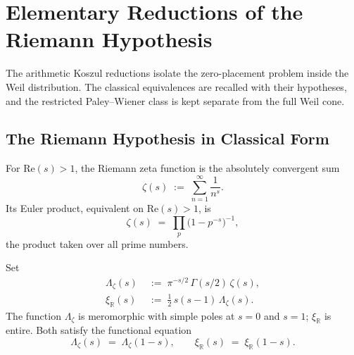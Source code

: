 \chapter{Elementary Reductions of the Riemann Hypothesis}
\label{v4-arith:w5-direct:closure-path}

The arithmetic Koszul reductions isolate the zero-placement problem
inside the Weil distribution.  The classical equivalences are recalled
with their hypotheses, and the restricted Paley--Wiener class is kept
separate from the full Weil cone.

\section{The Riemann Hypothesis in Classical Form}
\label{v4-arith:w5-direct:RH-classical}

\begin{definition}
\label{v4-arith:w5-direct:def:zeta}
For \(\mathrm{Re}(s)>1\), the Riemann zeta function is the absolutely
convergent sum
\begin{equation}
\label{v4-arith:w5-direct:eq:zeta-dirichlet}
\zeta(s)\;:=\;\sum_{n=1}^{\infty}\frac{1}{n^{s}}.
\end{equation}
Its Euler product, equivalent on \(\mathrm{Re}(s)>1\), is
\begin{equation}
\label{v4-arith:w5-direct:eq:zeta-euler}
\zeta(s)\;=\;\prod_{p}\bigl(1-p^{-s}\bigr)^{-1},
\end{equation}
the product taken over all prime numbers.
\end{definition}

\begin{definition}
\label{v4-arith:w5-direct:def:xi}
Set
\begin{align}
\label{v4-arith:w5-direct:eq:Lambda}
\Lambda_{\zeta}(s)
&\;:=\;\pi^{-s/2}\,\Gamma(s/2)\,\zeta(s),
\\[2pt]
\label{v4-arith:w5-direct:eq:xi}
\xi_{\mathbb{R}}(s)
&\;:=\;\tfrac{1}{2}\,s(s-1)\,\Lambda_{\zeta}(s).
\end{align}
The function \(\Lambda_{\zeta}\) is meromorphic with simple poles at
\(s=0\) and \(s=1\); \(\xi_{\mathbb{R}}\) is entire. Both satisfy the
functional equation
\begin{equation}
\label{v4-arith:w5-direct:eq:functional-equation}
\Lambda_{\zeta}(s)\;=\;\Lambda_{\zeta}(1-s),
\qquad
\xi_{\mathbb{R}}(s)\;=\;\xi_{\mathbb{R}}(1-s).
\end{equation}
\end{definition}

